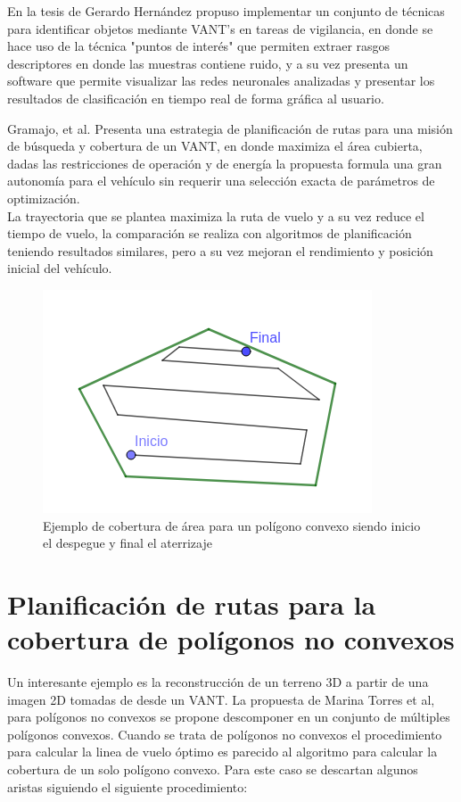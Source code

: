 \documentclass[]{report}
\begin{document}
En la tesis de Gerardo Hernández propuso implementar un conjunto de técnicas para identificar objetos mediante VANT's en tareas de vigilancia, en donde se hace uso de la técnica "puntos de interés" que permiten extraer rasgos descriptores en donde las muestras contiene ruido, y a su vez presenta un software que permite visualizar las redes neuronales analizadas y presentar los resultados de clasificación en tiempo real de forma gráfica al usuario. \cite{hernandez2016}

Gramajo, et al. Presenta una estrategia de planificación de rutas para una misión de búsqueda y cobertura de un VANT, en donde maximiza el área cubierta, dadas las restricciones de operación y de energía la propuesta formula una gran autonomía para el vehículo sin requerir una selección exacta de parámetros de optimización.\\
La trayectoria que se plantea maximiza la ruta de vuelo y a su vez reduce el tiempo de vuelo, la comparación se realiza con algoritmos de planificación teniendo resultados similares, pero a su vez mejoran el rendimiento y posición inicial del vehículo.\cite{gramajo2017}\\

 \begin{figure}[!h]
 	\centering
 	\includegraphics[width=.4\textwidth]{path_1}
 	\caption{Ejemplo de cobertura de área para un polígono convexo siendo inicio el despegue y final el aterrizaje}
 	\label{Path optima}
 \end{figure}

\section{Planificación de rutas para la cobertura de polígonos no convexos}

Un interesante ejemplo es la reconstrucción de un terreno  3D a partir de una imagen 2D tomadas de desde un VANT.
La propuesta de Marina Torres et al, para polígonos no convexos  se propone descomponer en un conjunto de múltiples polígonos convexos. Cuando se trata de polígonos no convexos el procedimiento para calcular la linea de vuelo óptimo es parecido al algoritmo para calcular la cobertura de un solo polígono convexo. Para este caso se descartan algunos aristas siguiendo el siguiente procedimiento:
\end{document}
